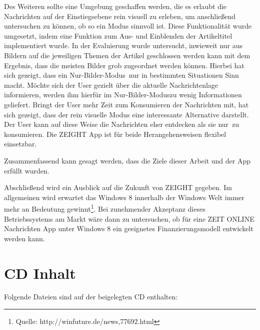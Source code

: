 \documentclass[12pt,a4paper,bibtotoc,abstracton]{scrartcl}
\begin{document}
{{{Des Weiteren sollte eine Umgebung geschaffen werden, die es erlaubt die  Nachrichten auf der Einstiegsebene rein visuell zu erleben, um anschließend untersuchen zu können, ob so ein Modus sinnvoll ist. Diese Funktionalität wurde umgesetzt, indem eine Funktion zum Aus- und Einblenden der Artikeltitel implementiert wurde. In der Evaluierung wurde untersucht, inwieweit nur aus Bildern auf die jeweiligen Themen der Artikel geschlossen werden kann mit dem Ergebnis, dass die meisten Bilder grob zugeordnet werden können. Hierbei hat sich gezeigt, dass ein \glqq Nur-Bilder-Modus\grqq\ nur in bestimmten Situationen Sinn macht. Möchte sich der User gezielt über die aktuelle Nachrichtenlage informieren, werden ihm hierfür im \glqq Nur-Bilder-Modus\grqq zu wenig Informationen geliefert. Bringt der User mehr Zeit zum Konsumieren der Nachrichten mit, hat sich gezeigt, dass der rein visuelle Modus eine interessante Alternative darstellt. Der User kann auf diese Weise die Nachrichten eher entdecken als sie \glqq nur\grqq\ zu konsumieren. Die ZEIGHT App ist für beide Herangehensweisen flexibel einsetzbar.

Zusammenfassend kann gesagt werden, dass die Ziele dieser Arbeit und der App erfüllt wurden. 

Abschließend wird ein Ausblick auf die Zukunft von ZEIGHT gegeben. Im allgemeinen wird erwartet das Windows 8 innerhalb der Windows Welt immer mehr an Bedeutung gewinnt\footnote{Quelle: http://winfuture.de/news,77692.html}. Bei zunehmender Akzeptanz dieses Betriebssystems am Markt wäre dann zu untersuchen, ob für eine ZEIT ONLINE Nachrichten App unter Windows 8 ein geeignetes Finanzierungsmodell entwickelt werden kann.

\newpage
\begin{singlespace}
	
	
\end{singlespace}

\newpage
\appendix
{}
\thispagestyle{plain}





\section{CD Inhalt}
\label{app:cd}
Folgende Dateien sind auf der beigelegten CD enthalten:

}}}
\end{document}
